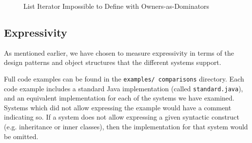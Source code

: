 \documentclass{acm_proc_article-sp}
\begin{document}
\begin{figure}[t]
	\centering
	\hspace{\columnsep}
	\caption{List Iterator Impossible to Define with Owners-as-Dominators}
	\label{fig:iterator-fail}
\end{figure}

\subsection{Expressivity}
\label{subsec:expressivity}

As mentioned earlier, we have chosen to measure expressivity in terms of the
design patterns and object structures that the different systems support.

Full code examples can be found in the \texttt{examples/\linebreak~comparisons}
directory. Each code example includes a standard Java implementation (called
\texttt{standard.java}), and an equivalent implementation for each of the
systems we have examined. Systems which did not allow expressing the example
would have a comment indicating so. If a system does not allow expressing a
given syntactic construct (e.g. inheritance or inner classes), then the
implementation for that system would be omitted.
\end{document}
